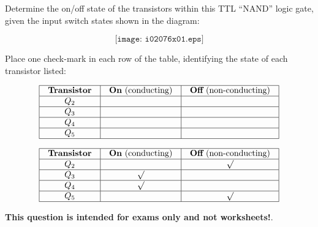 

Determine the on/off state of the transistors within this TTL ``NAND'' logic gate, given the input switch states shown in the diagram:

$$\texttt{[image: i02076x01.eps]}$$

Place one check-mark in each row of the table, identifying the state of each transistor listed:


$$\vbox{\offinterlineskip
\halign{\strut
\vrule \quad\hfil # \ \hfil & 
\vrule \quad\hfil # \ \hfil & 
\vrule \quad\hfil # \ \hfil \vrule \cr
\noalign{\hrule}
%
{\bf Transistor} & {\bf On} (conducting) & {\bf Off} (non-conducting) \cr
%
\noalign{\hrule}
%
$Q_2$ &  &  \cr
%
\noalign{\hrule}
%
$Q_3$ &  &  \cr
%
\noalign{\hrule}
%
$Q_4$ &  &  \cr
%
\noalign{\hrule}
%
$Q_5$ &  &  \cr
%
\noalign{\hrule}
} %
}$$ %








$$\vbox{\offinterlineskip
\halign{\strut
\vrule \quad\hfil # \ \hfil & 
\vrule \quad\hfil # \ \hfil & 
\vrule \quad\hfil # \ \hfil \vrule \cr
\noalign{\hrule}
%
{\bf Transistor} & {\bf On} (conducting) & {\bf Off} (non-conducting) \cr
%
\noalign{\hrule}
%
$Q_2$ &  & $\surd$ \cr
%
\noalign{\hrule}
%
$Q_3$ & $\surd$ &  \cr
%
\noalign{\hrule}
%
$Q_4$ & $\surd$ &  \cr
%
\noalign{\hrule}
%
$Q_5$ &  & $\surd$ \cr
%
\noalign{\hrule}
} %
}$$ %







{\bf This question is intended for exams only and not worksheets!}.


